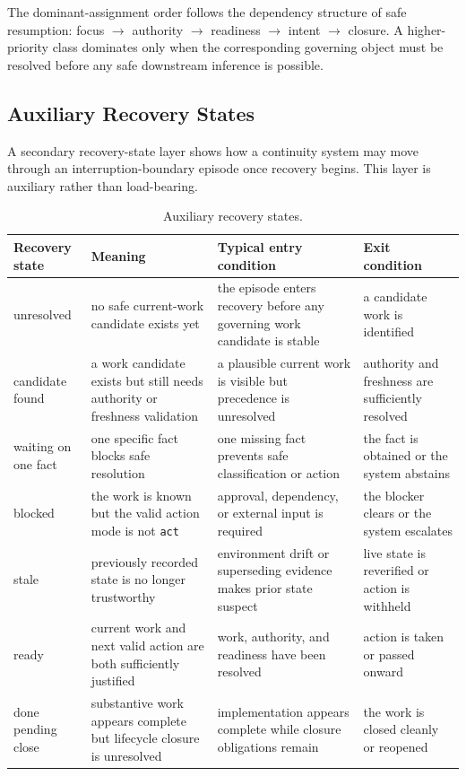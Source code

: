 \documentclass[preprint,12pt]{elsarticle}
\begin{document}
The dominant-assignment order follows the dependency structure of safe resumption: focus $\rightarrow$ authority $\rightarrow$ readiness $\rightarrow$ intent $\rightarrow$ closure. A higher-priority class dominates only when the corresponding governing object must be resolved before any safe downstream inference is possible.

\subsection{Auxiliary Recovery States}

A secondary recovery-state layer shows how a continuity system may move through an interruption-boundary episode once recovery begins. This layer is auxiliary rather than load-bearing.

\begin{table}[H]
\caption{Auxiliary recovery states.}
\label{tab:recovery-states}
\centering
\footnotesize
\setlength{\tabcolsep}{4pt}
\begin{tabularx}{\textwidth}{>{\raggedright\arraybackslash}p{} >{\raggedright\arraybackslash}p{} >{\raggedright\arraybackslash}p{} X}
\toprule
Recovery state & Meaning & Typical entry condition & Exit condition \\
\midrule
unresolved & no safe current-work candidate exists yet & the episode enters recovery before any governing work candidate is stable & a candidate work is identified \\
candidate found & a work candidate exists but still needs authority or freshness validation & a plausible current work is visible but precedence is unresolved & authority and freshness are sufficiently resolved \\
waiting on one fact & one specific fact blocks safe resolution & one missing fact prevents safe classification or action & the fact is obtained or the system abstains \\
blocked & the work is known but the valid action mode is not \texttt{act} & approval, dependency, or external input is required & the blocker clears or the system escalates \\
stale & previously recorded state is no longer trustworthy & environment drift or superseding evidence makes prior state suspect & live state is reverified or action is withheld \\
ready & current work and next valid action are both sufficiently justified & work, authority, and readiness have been resolved & action is taken or passed onward \\
done pending close & substantive work appears complete but lifecycle closure is unresolved & implementation appears complete while closure obligations remain & the work is closed cleanly or reopened \\
\bottomrule
\end{tabularx}
\end{table}
\end{document}
